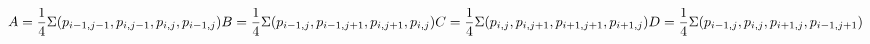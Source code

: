 

$$
A = \frac{1}{4}\Sigma ( p_{i-1,j-1}, p_{i,j-1}, p_{i,j} , p_{i-1,j} ) \\
B = \frac{1}{4}\Sigma ( p_{i-1,j}, p_{i-1,j+1} , p_{i,j+1}, p_{i,j} ) \\
C = \frac{1}{4}\Sigma ( p_{i,j}, p_{i,j+1} , p_{i+1,j+1}, p_{i+1,j} ) \\
D = \frac{1}{4}\Sigma ( p_{i-1,j}, p_{i,j} , p_{i+1,j} , p_{i-1,j+1} ) \\
$$

